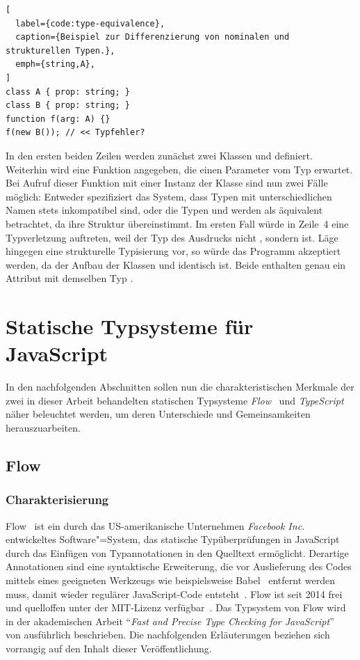 \begin{lstlisting}[
  label={code:type-equivalence},
  caption={Beispiel zur Differenzierung von nominalen und strukturellen Typen.},
  emph={string,A},
]
class A { prop: string; }
class B { prop: string; }
function f(arg: A) {}
f(new B()); // << Typfehler?
\end{lstlisting}

In den ersten beiden Zeilen werden zunächst zwei Klassen  und  definiert. Weiterhin wird eine Funktion  angegeben, die einen Parameter vom Typ  erwartet. Bei Aufruf dieser Funktion mit einer Instanz der Klasse  sind nun zwei Fälle möglich: Entweder spezifiziert das System, dass Typen mit unterschiedlichen Namen stets inkompatibel sind, oder die Typen  und  werden als äquivalent betrachtet, da ihre Struktur übereinstimmt. Im ersten Fall würde in Zeile~4 eine Typverletzung auftreten, weil der Typ des Ausdrucks  nicht , sondern  ist. Läge hingegen eine strukturelle Typisierung vor, so würde das Programm akzeptiert werden, da der Aufbau der Klassen  und  identisch ist. Beide enthalten genau ein Attribut  mit demselben Typ .

\section{Statische Typsysteme für JavaScript}
\label{sec:static-typesystems-for-js}

In den nachfolgenden Abschnitten sollen nun die charakteristischen Merkmale der zwei in dieser Arbeit behandelten statischen Typsysteme \textit{Flow}~\autocite{FLOW:PAPER} und \textit{TypeScript}~\autocite{TYPESCRIPT:SPEC} näher beleuchtet werden, um deren Unterschiede und Gemeinsamkeiten herauszuarbeiten.

\subsection{Flow}
\label{sec:flow}

\subsubsection{Charakterisierung}

Flow~\autocite{FLOW:PAPER} ist ein durch das US-amerikanische Unternehmen \textit{Facebook Inc.} entwickeltes Software"=System, das statische Typüberprüfungen in JavaScript durch das Einfügen von Typannotationen in den Quelltext ermöglicht. Derartige Annotationen sind eine syntaktische Erweiterung, die vor Auslieferung des Codes mittels eines geeigneten Werkzeugs wie beispielsweise Babel~\autocite{BABEL} entfernt werden muss, damit wieder regulärer JavaScript-Code entsteht~\autocite{FLOW:INSTALLATION}. Flow ist seit 2014 frei und quelloffen unter der MIT-Lizenz verfügbar~\autocites{LICENSE:MIT,FLOW:GITHUB}. Das Typsystem von Flow wird in der akademischen Arbeit \enquote{\textit{Fast and Precise Type Checking for JavaScript}}~\autocite{FLOW:PAPER} von \citeauthor{FLOW:PAPER} ausführlich beschrieben. Die nachfolgenden Erläuterungen beziehen sich vorrangig auf den Inhalt dieser Veröffentlichung.

